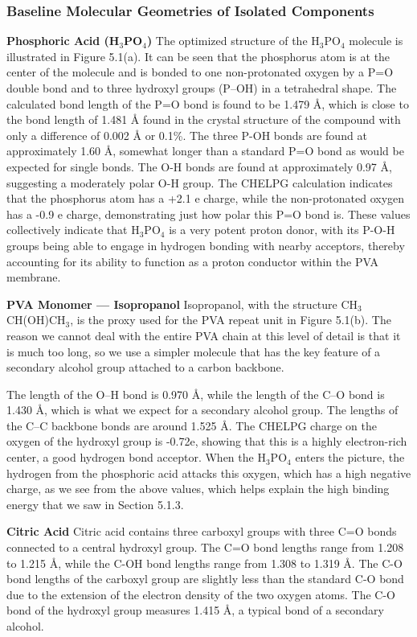 \documentclass[12pt,a4paper]{report}
\begin{document}
\subsubsection{Baseline Molecular Geometries of Isolated Components}

\textbf{Phosphoric Acid (H\(_3\)PO\(_4\))}
The optimized structure of the H\(_3\)PO\(_4\) molecule is illustrated in Figure 5.1(a). It can be seen that the phosphorus atom is at the center of the molecule and is bonded to one non-protonated oxygen by a P=O double bond and to three hydroxyl groups (P–OH) in a tetrahedral shape. The calculated bond length of the P=O bond is found to be 1.479 Å, which is close to the bond length of 1.481 Å found in the crystal structure of the compound with only a difference of 0.002 Å or 0.1\%.\cite{76}
The three P-OH bonds are found at approximately 1.60 Å, somewhat longer than a standard P=O bond as would be expected for single bonds. The O-H bonds are found at approximately 0.97 Å, suggesting a moderately polar O-H group. The CHELPG calculation\cite{99} indicates that the phosphorus atom has a +2.1 e charge, while the non-protonated oxygen has a -0.9 e charge, demonstrating just how polar this P=O bond is. These values collectively indicate that H\(_3\)PO\(_4\) is a very potent proton donor, with its P-O-H groups being able to engage in hydrogen bonding with nearby acceptors, thereby accounting for its ability to function as a proton conductor within the PVA membrane.

\textbf{PVA Monomer — Isopropanol}
Isopropanol, with the structure CH\(_3\)CH(OH)CH\(_3\), is the proxy used for the PVA repeat unit in Figure 5.1(b). The reason we cannot deal with the entire PVA chain at this level of detail is that it is much too long, so we use a simpler molecule that has the key feature of a secondary alcohol group attached to a carbon backbone.\cite{18,19}

The length of the O–H bond is 0.970 Å, while the length of the C–O bond is 1.430 Å, which is what we expect for a secondary alcohol group. The lengths of the C–C backbone bonds are around 1.525 Å. The CHELPG charge on the oxygen of the hydroxyl group is -0.72e,\cite{99} showing that this is a highly electron-rich center, a good hydrogen bond acceptor. When the H\(_3\)PO\(_4\) enters the picture, the hydrogen from the phosphoric acid attacks this oxygen, which has a high negative charge, as we see from the above values, which helps explain the high binding energy that we saw in Section 5.1.3.

\textbf{Citric Acid}
Citric acid contains three carboxyl groups with three C=O bonds connected to a central hydroxyl group. The C=O bond lengths range from 1.208 to 1.215 Å, while the C-OH bond lengths range from 1.308 to 1.319 Å. The C-O bond lengths of the carboxyl group are slightly less than the standard C-O bond due to the extension of the electron density of the two oxygen atoms. The C-O bond of the hydroxyl group measures 1.415 Å, a typical bond of a secondary alcohol.
\end{document}
